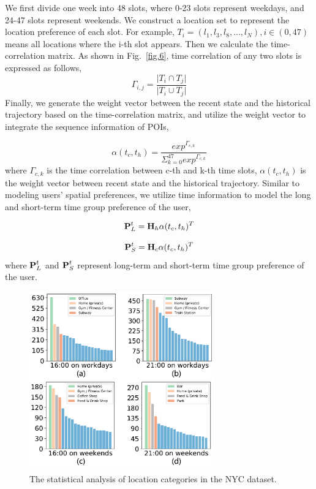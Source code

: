 \documentclass[10pt,journal,compsoc]{IEEEtran}
\begin{document}
We first divide one week into 48 slots, where 0-23 slots represent weekdays, and 24-47 slots represent weekends. We construct a location set to represent the location preference of each slot. For example, $T_i = (l_1,l_3,l_8,...,l_N),i\in{(0,47)}$ means all locations where the i-th slot appears. Then we calculate the time-correlation matrix. As shown in  Fig.~\ref{fig.6}, time correlation of any two slots is expressed as follows,
\begin{equation}
    \Gamma_{i,j} = \frac{\lvert{T_i\cap{T_j}}\rvert}{\lvert{T_i\cup{T_j}}\rvert{}}
\end{equation}
Finally, we generate the weight vector between the recent state and the historical trajectory based on the time-correlation matrix, and utilize the weight vector to integrate the sequence information of POIs,

\begin{equation}
    \alpha{(t_c,t_h)} = \frac{exp^{\Gamma_{c,k}}}{\Sigma^{47}_{k=0}exp^{\Gamma_{c,k}}}
\end{equation}
where $\Gamma_{c,k}$ is the time correlation between c-th and k-th time slots, $\alpha({t_c,t_h})$ is the weight vector between recent state and the historical trajectory. Similar to modeling users' spatial preferences, we utilize time information to model the long and short-term time group preference of the user,

\begin{equation}
    \bm{{\rm P}}^{t}_{L} = \bm{{\rm H}}_{h}\alpha(t_c,t_h)^{T}
\end{equation}

\begin{equation}
    \bm{{\rm P}}^{t}_{S} = \bm{{\rm H}}_{c}\alpha(t_c,t_h)^{T}
\end{equation}
where $\bm{{\rm P}}^{t}_L$ and $\bm{{\rm P}}^{t}_S$ represent long-term and short-term time group preference of the user.

\begin{figure}[htpb]
    \centering
    \includegraphics[width=8cm]{figure/category.pdf}
    \caption{The statistical analysis of location categories in the NYC dataset.}
    \label{fig.7}
\end{figure}
\end{document}
